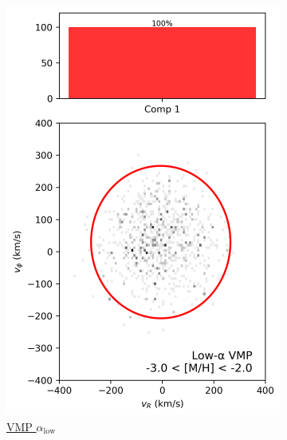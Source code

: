 \documentclass[a4paper,10pt]{article}
\begin{document}
\begin{multicols}{2}
\begin{figure}[H]
  \begin{subfigure}[t]{0.24\linewidth}
    \includegraphics[width=\linewidth]{../figures/gmm_vmp_low_alpha_k1.png}
    \caption{\href{https://raw.githack.com/raunaq-rai/Disentangling-the-Milky-Way-using-GMM/main/figures/VMP\_low\_\_\_\_-3\%5BM\_H\%5D-2.html}{VMP $\alpha_{\mathrm{low}}$}}
    \label{fig:low_vmp}
  \end{subfigure}\hfill
  \begin{subfigure}[t]{0.24\linewidth}

\end{subfigure}
\end{figure}
\end{multicols}
\end{document}

